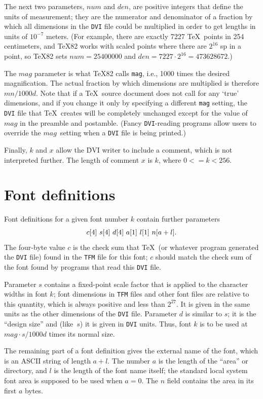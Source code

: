 \documentclass[10pt, a4paper, english]{article}
\begin{document}
The next two parameters, $num$ and $den$, are positive integers that define
the units of measurement; they are the numerator and denominator of a
fraction by which all dimensions in the \texttt{DVI} file could be multiplied
in order to get lengths in units of $10^{-7}$ meters. (For example, there are
exactly 7227 \TeX\ points in 254 centimeters, and \TeX82 works with scaled
points where there are $2^{16}$ sp in a point, so \TeX82 sets $num=25400000$
and $den=7227\cdot2^{16}=473628672$.)


The $mag$ parameter is what \TeX82 calls \texttt{mag}, i.e., 1000 times the
desired magnification. The actual fraction by which dimensions are
multiplied is therefore $mn/1000d$. Note that if a \TeX\ source document
does not call for any `{true}' dimensions, and if you change it only by
specifying a different \texttt{mag} setting, the \texttt{DVI} file that \TeX\
creates will be completely unchanged except for the value of $mag$ in the
preamble and postamble. (Fancy \texttt{DVI}-reading programs allow users to
override the $mag$~setting when a \texttt{DVI} file is being printed.)

Finally, $k$ and $x$ allow the \.{DVI} writer to include a comment, which is not
interpreted further. The length of comment $x$ is $k$, where $0<=k<256$.


\section{Font definitions}\label{sec:fontDef}

Font definitions for a given font number $k$ contain further parameters
\[
\hbox{$c[4]$ $s[4]$ $d[4]$ $a[1]$ $l[1]$ $n[a+l]$.}
\]
The four-byte value $c$ is the check sum that \TeX\ (or whatever program
generated the \texttt{DVI} file) found in the \texttt{TFM} file for this font;
$c$ should match the check sum of the font found by programs that read
this \texttt{DVI} file.


Parameter $s$ contains a fixed-point scale factor that is applied to the
character widths in font $k$; font dimensions in \texttt{TFM} files and other
font files are relative to this quantity, which is always positive and
less than $2^{27}$. 
It is given in the same units as the other dimensions of the \texttt{DVI} file. 
Parameter $d$ is similar to $s$; it is the ``design size'' 
and (like~$s$) it is given in \texttt{DVI} units. 
Thus, font $k$ is to be used at $mag\cdot s/1000d$ times its normal size.

The remaining part of a font definition gives the external name of the font,
which is an ASCII string of length $a+l$. The number $a$ is the length
of the ``area'' or directory, and $l$ is the length of the font name itself;
the standard local system font area is supposed to be used when $a=0$.
The $n$ field contains the area in its first $a$ bytes.
\end{document}

